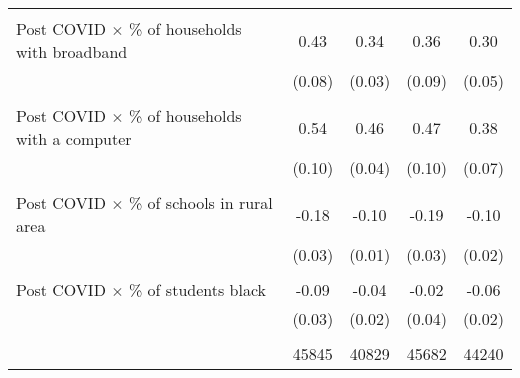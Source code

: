 \begin{table}[htbp]
{\begin{tabular*}{1\textwidth}{@{\extracolsep{\fill}}l*{4}{c}}
                    &                     &                     &                     &                     \\
Post COVID $\times$ \% of households with broadband&        0.43\sym{***}&        0.34\sym{***}&        0.36\sym{***}&        0.30\sym{***}\\
                    &      (0.08)         &      (0.03)         &      (0.09)         &      (0.05)         \\
                    &                     &                     &                     &                     \\
Post COVID $\times$ \% of households with a computer&        0.54\sym{***}&        0.46\sym{***}&        0.47\sym{***}&        0.38\sym{***}\\
                    &      (0.10)         &      (0.04)         &      (0.10)         &      (0.07)         \\
                    &                     &                     &                     &                     \\
Post COVID $\times$ \% of schools in rural area&       -0.18\sym{***}&       -0.10\sym{***}&       -0.19\sym{***}&       -0.10\sym{***}\\
                    &      (0.03)         &      (0.01)         &      (0.03)         &      (0.02)         \\
                    &                     &                     &                     &                     \\
Post COVID $\times$ \% of students black&       -0.09\sym{***}&       -0.04\sym{***}&       -0.02         &       -0.06\sym{***}\\
                    &      (0.03)         &      (0.02)         &      (0.04)         &      (0.02)         \\
                    &                     &                     &                     &                     \\
\hline
& 45845 & 40829 & 45682 & 44240
\end{tabular*}
}
\end{table}
